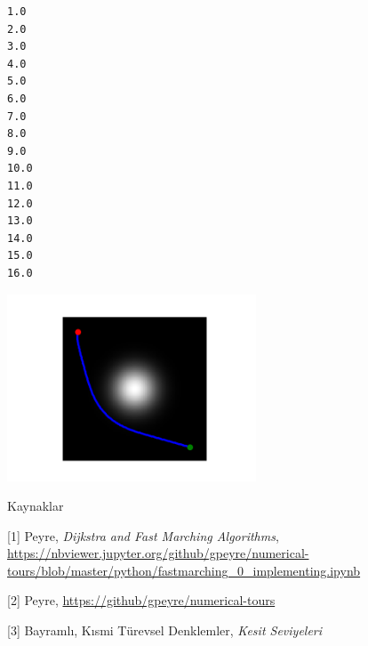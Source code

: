 \documentclass[12pt,fleqn]{article}\usepackage{../../common}
\begin{document}
\begin{verbatim}
1.0
2.0
3.0
4.0
5.0
6.0
7.0
8.0
9.0
10.0
11.0
12.0
13.0
14.0
15.0
16.0
\end{verbatim}

\includegraphics[width=20em]{out-760.png}




Kaynaklar

[1] Peyre, {\em Dijkstra and Fast Marching Algorithms},
\url{https://nbviewer.jupyter.org/github/gpeyre/numerical-tours/blob/master/python/fastmarching_0_implementing.ipynb}

[2] Peyre, \url{https://github/gpeyre/numerical-tours}

[3] Bayramlı, Kısmi Türevsel Denklemler, {\em Kesit Seviyeleri}
\end{document}
